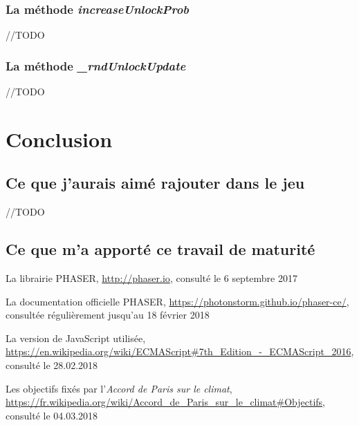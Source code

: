 \documentclass{article}
\begin{document}
        \subsubsection{La méthode \textit{increaseUnlockProb}}
        //TODO
        
        \subsubsection{La méthode \textit{\_rndUnlockUpdate}} \label{rndUnlockUpdate}
        //TODO
        
        \section{Conclusion}
        \subsection{Ce que j'aurais aimé rajouter dans le jeu}
		//TODO
		
		\subsection{Ce que m'a apporté ce travail de maturité}
        
        \newpage
        \begin{thebibliography}{9}

  			La librairie PHASER,
  			\url{http://phaser.io},
  			consulté le 6 septembre 2017
  			
  			La documentation officielle PHASER,
  			\url{https://photonstorm.github.io/phaser-ce/},
  			consultée régulièrement jusqu'au 18 février 2018
  			
  			La version de JavaScript utilisée,
  			\url{https://en.wikipedia.org/wiki/ECMAScript#7th_Edition_-_ECMAScript_2016},
  			consulté le 28.02.2018
  			
  			Les objectifs fixés par l'\textit{Accord de Paris sur le climat},
  			\url{https://fr.wikipedia.org/wiki/Accord_de_Paris_sur_le_climat#Objectifs},
  			consulté le 04.03.2018
  			
  			
		\end{thebibliography}
\end{document}
